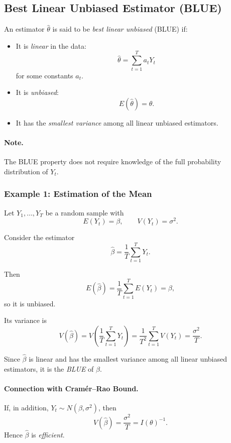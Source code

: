 \subsection{Best Linear Unbiased Estimator (BLUE)}

An estimator $\hat{\theta}$ is said to be \emph{best linear unbiased} (BLUE) if:

\begin{itemize}
\item It is \emph{linear} in the data:
\[
\hat{\theta} = \sum_{t=1}^T a_t Y_t
\]
for some constants $a_t$.

\item It is \emph{unbiased}:
\[
E(\hat{\theta}) = \theta.
\]

\item It has the \emph{smallest variance} among all linear unbiased estimators.
\end{itemize}

\paragraph{Note.}
The BLUE property does not require knowledge of the full probability distribution of $Y_t$.

\subsubsection{Example 1: Estimation of the Mean}

Let $Y_1,\dots,Y_T$ be a random sample with
\[
E(Y_t) = \beta,
\qquad
V(Y_t) = \sigma^2.
\]

Consider the estimator
\[
\hat{\beta}
=
\frac{1}{T}\sum_{t=1}^T Y_t.
\]

Then
\[
E(\hat{\beta})
=
\frac{1}{T}\sum_{t=1}^T E(Y_t)
=
\beta,
\]
so it is unbiased.

Its variance is
\[
V(\hat{\beta})
=
V\!\left(\frac{1}{T}\sum_{t=1}^T Y_t\right)
=
\frac{1}{T^2}\sum_{t=1}^T V(Y_t)
=
\frac{\sigma^2}{T}.
\]

Since $\hat{\beta}$ is linear and has the smallest variance among all linear unbiased estimators,
it is the \emph{BLUE} of $\beta$.


\paragraph{Connection with Cram\'er--Rao Bound.}


If, in addition, $Y_t \sim N(\beta,\sigma^2)$, then
\[
V(\hat{\beta}) = \frac{\sigma^2}{T} = I(\theta)^{-1}.
\]
Hence $\hat{\beta}$ is \emph{efficient}.

